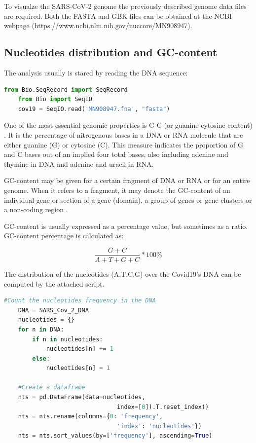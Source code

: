 To visualze the SARS-CoV-2 genome the previously described genome data files are required.
Both the FASTA and GBK files can be obtained at the NCBI webpage (https://www.ncbi.nlm.nih.gov/nuccore/MN908947).

\subsection{Nucleotides distribution and GC-content}

The analysis usually is stared by reading the DNA sequence:
\begin{lstlisting}[language=Python, caption=Python example]
    from Bio.SeqRecord import SeqRecord
    from Bio import SeqIO
    cov19 = SeqIO.read('MN908947.fna', "fasta")
\end{lstlisting}

One of the most essential genomic properties is G-C (or guanine-cytosine content) \cite{gccontent2}.
It is the percentage of nitrogenous bases in a DNA or RNA molecule that are either guanine (G) or cytosine (C).
This measure indicates the proportion of G and C bases out of an implied four total bases, also including adenine and thymine in DNA and adenine and uracil in RNA.

GC-content may be given for a certain fragment of DNA or RNA or for an entire genome. 
When it refers to a fragment, it may denote the GC-content of an individual gene or section of a gene (domain), a group of genes or gene clusters or a non-coding region \cite{gccontent}.

GC-content is usually expressed as a percentage value, but sometimes as a ratio. 
GC-content percentage is calculated as:

    \[\frac{G+C}{A+T+G+C}*100\%\]

The distribution of the nucleotides (A,T,C,G) over the Covid19's DNA can be computed by the attached script.
\begin{lstlisting}[language=Python, caption=The script for computing the distribution of the nucleotides over the SARS-CoV-2 genome.]
    #Count the nucleotides frequency in the DNA
    DNA = SARS_Cov_2_DNA
    nucleotides = {}
    for n in DNA:
        if n in nucleotides:
            nucleotides[n] += 1
        else:
            nucleotides[n] = 1

    #Create a dataframe
    nts = pd.DataFrame(data=nucleotides, 
                                index=[0]).T.reset_index()
    nts = nts.rename(columns={0: 'frequency', 
                                'index': 'nucleotides'})
    nts = nts.sort_values(by=['frequency'], ascending=True)
\end{lstlisting}

